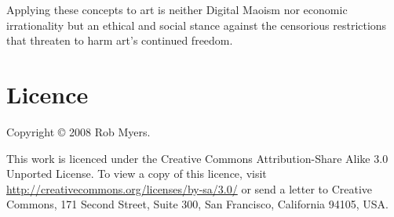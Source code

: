 \documentclass[11pt, a4]{article}
\begin{document}
Applying these concepts to art is neither Digital Maoism nor economic irrationality but an ethical and social stance against the censorious restrictions that threaten to harm art's continued freedom. 


\begingroup
\renewcommand{\enotesize}{\normalsize}
\theendnotes
\endgroup





\section {Licence}

Copyright \copyright{} 2008 Rob Myers.

This work is licenced under the Creative Commons Attribution-Share Alike 3.0 Unported License. To view a copy of this licence, visit \url{http://creativecommons.org/licenses/by-sa/3.0/} or send a letter to Creative Commons, 171 Second Street, Suite 300, San Francisco, California 94105, USA.
\end{document}
